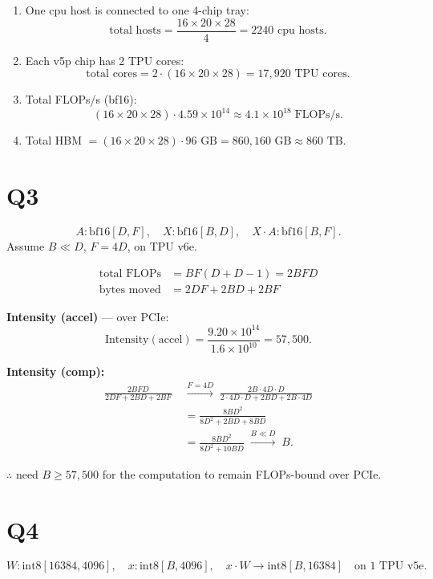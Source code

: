 \documentclass[11pt]{article}
\newcommand{\flops}{\text{FLOPs}}
\newcommand{\flopss}{\text{FLOPs/s}}
\begin{document}
\begin{enumerate}[label=(\roman*)]
  \item One cpu host is connected to one 4-chip tray:
  \[
  \text{total hosts} = \frac{16 \times 20 \times 28}{4} = 2240 \text{ cpu hosts}.
  \]
  \item Each v5p chip has 2 TPU cores:
  \[
  \text{total cores} = 2 \cdot (16 \times 20 \times 28) = 17{,}920 \text{ TPU cores}.
  \]
  \item Total FLOPs/s (bf16):
  \[
  (16 \times 20 \times 28) \cdot 4.59 \times 10^{14} \approx 4.1 \times 10^{18} \; \flopss.
  \]
  \item Total HBM $= (16 \times 20 \times 28) \cdot 96 \text{ GB} = 860{,}160 \text{ GB} \approx 860 \text{ TB}$.
\end{enumerate}

\section*{Q3}

\[
A : \text{bf16}[D, F], \quad X : \text{bf16}[B, D], \quad X \cdot A : \text{bf16}[B, F].
\]
Assume $B \ll D$, $F = 4D$, on TPU v6e.

\begin{align*}
\text{total } \flops &= BF(D + D - 1) = 2BFD \\
\text{bytes moved} &= 2DF + 2BD + 2BF
\end{align*}

\textbf{Intensity (accel)} --- over PCIe:
\[
\text{Intensity}(\text{accel}) = \frac{9.20 \times 10^{14}}{1.6 \times 10^{10}} = 57{,}500.
\]

\textbf{Intensity (comp):}
\begin{align*}
\frac{2BFD}{2DF + 2BD + 2BF}
\;&\xrightarrow{F = 4D}\;
\frac{2B \cdot 4D \cdot D}{2 \cdot 4D \cdot D + 2BD + 2B \cdot 4D} \\
&= \frac{8BD^2}{8D^2 + 2BD + 8BD} \\
&= \frac{8BD^2}{8D^2 + 10BD}
\;\xrightarrow{B \ll D}\; B.
\end{align*}

$\therefore$ need $B \geq 57{,}500$ for the computation to remain FLOPs-bound over PCIe.

\section*{Q4}

\[
W : \text{int8}[16384, 4096], \quad x : \text{int8}[B, 4096], \quad x \cdot W \to \text{int8}[B, 16384] \quad \text{on 1 TPU v5e.}
\]
\end{document}
